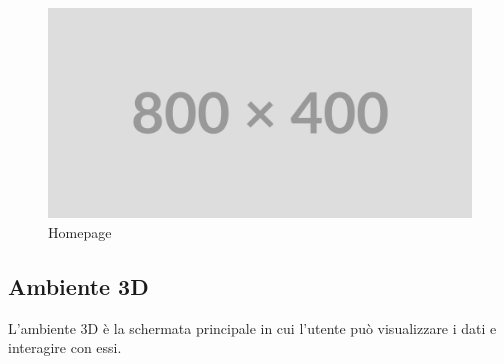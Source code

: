 \begin{figure}[ht!]
    \centering
    \includegraphics[scale=0.6]{template/images/placeholder.png}
    \caption{Homepage}
\end{figure}

\subsection{Ambiente 3D}
L'ambiente 3D è la schermata principale in cui l'utente può visualizzare i dati
e interagire con essi.


